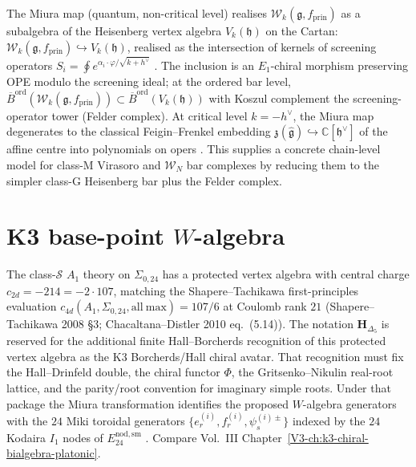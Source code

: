 \begin{remark}\label{rem:miura-chiral-compatibility}
The Miura map (quantum, non-critical level) realises $\mathcal{W}_k(\mathfrak{g}, f_{\mathrm{prin}})$ as a subalgebra of the Heisenberg vertex algebra $V_k(\mathfrak{h})$ on the Cartan:
$\mathcal{W}_k(\mathfrak{g}, f_{\mathrm{prin}}) \hookrightarrow V_k(\mathfrak{h})$,
realised as the intersection of kernels of screening operators $S_i = \oint e^{\alpha_i \cdot \varphi/\sqrt{k+h^\vee}}$ \cite{FF92,FL88}. The inclusion is an $E_1$-chiral morphism preserving OPE modulo the screening ideal; at the ordered bar level, $\overline{B}^{\mathrm{ord}}(\mathcal{W}_k(\mathfrak{g}, f_{\mathrm{prin}})) \subset \overline{B}^{\mathrm{ord}}(V_k(\mathfrak{h}))$ with Koszul complement the screening-operator tower (Felder complex). At critical level $k = -h^\vee$, the Miura map degenerates to the classical Feigin--Frenkel embedding $\mathfrak{z}(\widehat{\mathfrak{g}}) \hookrightarrow \mathbb{C}[\mathfrak{h}^\vee]$ of the affine centre into polynomials on opers \cite{Ara07}. This supplies a concrete chain-level model for class-M Virasoro and $\mathcal{W}_N$ bar complexes by reducing them to the simpler class-G Heisenberg bar plus the Felder complex.
\end{remark}

\section{K3 base-point $W$-algebra}
\label{sec:wa-supplement}

\begin{remark}
\label{rem:wa-1}
The class-$\mathcal S$ $A_1$ theory on $\Sigma_{0,24}$ has a protected
vertex algebra with central charge
$c_{2d} = -214 = -2\cdot 107$, matching the Shapere--Tachikawa
first-principles evaluation
$c_{4d}(A_1, \Sigma_{0,24}, \mathrm{all\ max}) = 107/6$ at Coulomb
rank $21$ (Shapere--Tachikawa 2008 \S 3; Chacaltana--Distler 2010
eq.~(5.14)). The notation $\mathbf H_{\Delta_5}$ is reserved for the
additional finite Hall--Borcherds recognition of this protected vertex
algebra as the K3 Borcherds/Hall chiral avatar. That recognition must
fix the Hall--Drinfeld double, the chiral functor $\Phi$, the
Gritsenko--Nikulin real-root lattice, and the parity/root convention for
imaginary simple roots. Under that package the Miura transformation
identifies the proposed $W$-algebra generators with the
$24$ Miki toroidal generators $\{e^{(i)}_r, f^{(i)}_r, \psi^{(i)\pm}_s\}$
indexed by the $24$ Kodaira $I_1$ nodes of $E^{\mathrm{nod,sm}}_{24}$
\cite{Gaiotto2009,Miki07}. Compare Vol.~III
Chapter~\ref{V3-ch:k3-chiral-bialgebra-platonic}.
\end{remark}

